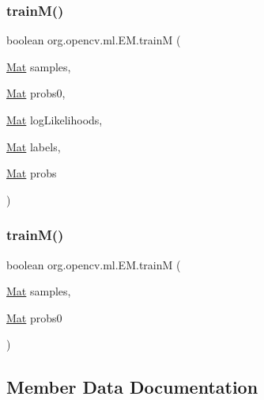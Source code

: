 \subsubsection{\texorpdfstring{train\+M()}{trainM()}\hspace{0.1cm}{\footnotesize\ttfamily [1/2]}}
{\footnotesize\ttfamily boolean org.\+opencv.\+ml.\+E\+M.\+trainM (\begin{DoxyParamCaption}\item[{\mbox{\hyperlink{classorg_1_1opencv_1_1core_1_1_mat}{Mat}}}]{samples,  }\item[{\mbox{\hyperlink{classorg_1_1opencv_1_1core_1_1_mat}{Mat}}}]{probs0,  }\item[{\mbox{\hyperlink{classorg_1_1opencv_1_1core_1_1_mat}{Mat}}}]{log\+Likelihoods,  }\item[{\mbox{\hyperlink{classorg_1_1opencv_1_1core_1_1_mat}{Mat}}}]{labels,  }\item[{\mbox{\hyperlink{classorg_1_1opencv_1_1core_1_1_mat}{Mat}}}]{probs }\end{DoxyParamCaption})}

\mbox{\label{classorg_1_1opencv_1_1ml_1_1_e_m_a033388662534cca4206a833e8f14e8f8}} 
\subsubsection{\texorpdfstring{train\+M()}{trainM()}\hspace{0.1cm}{\footnotesize\ttfamily [2/2]}}
{\footnotesize\ttfamily boolean org.\+opencv.\+ml.\+E\+M.\+trainM (\begin{DoxyParamCaption}\item[{\mbox{\hyperlink{classorg_1_1opencv_1_1core_1_1_mat}{Mat}}}]{samples,  }\item[{\mbox{\hyperlink{classorg_1_1opencv_1_1core_1_1_mat}{Mat}}}]{probs0 }\end{DoxyParamCaption})}



\subsection{Member Data Documentation}
\mbox{\label{classorg_1_1opencv_1_1ml_1_1_e_m_a2e74f419371b3c7e84535edc80fb66ff}} 
